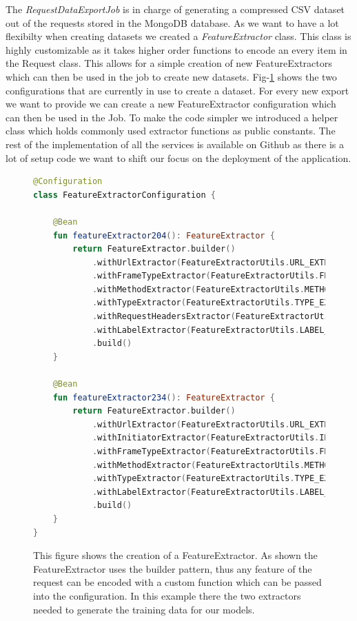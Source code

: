 The \emph{RequestDataExportJob} is in charge of generating a compressed CSV dataset out of the requests stored in the MongoDB database. As we want 
to have a lot flexibilty when creating datasets we created a \emph{FeatureExtractor} class. This class is highly customizable as it takes higher order functions
to encode an every item in the Request class. This allows for a simple creation of new FeatureExtractors which can then be used in the job to create new datasets.
Fig-\ref{fig:Feature} shows the two configurations that are currently in use to create a dataset. For every new export we want to provide we 
can create a new FeatureExtractor configuration which can then be used in the Job. To make the code simpler we introduced a helper class which 
holds commonly used extractor functions as public constants. The rest of the implementation of all the services is available on Github \cite{trackingDetectorInfra} as there is
a lot of setup code we want to shift our focus on the deployment of the application.
\begin{figure}[ht!]
\begin{lstlisting}[language=Kotlin]
@Configuration
class FeatureExtractorConfiguration {

    @Bean
    fun featureExtractor204(): FeatureExtractor {
        return FeatureExtractor.builder()
            .withUrlExtractor(FeatureExtractorUtils.URL_EXTRACTOR)
            .withFrameTypeExtractor(FeatureExtractorUtils.FRAME_TYPE_EXTRACTOR)
            .withMethodExtractor(FeatureExtractorUtils.METHOD_EXTRACTOR)
            .withTypeExtractor(FeatureExtractorUtils.TYPE_EXTRACTOR)
            .withRequestHeadersExtractor(FeatureExtractorUtils.REQUEST_HEADER_REFERER)
            .withLabelExtractor(FeatureExtractorUtils.LABEL_EXTRACTOR)
            .build()
    }

    @Bean
    fun featureExtractor234(): FeatureExtractor {
        return FeatureExtractor.builder()
            .withUrlExtractor(FeatureExtractorUtils.URL_EXTRACTOR)
            .withInitiatorExtractor(FeatureExtractorUtils.INITIATOR_EXTRACTOR)
            .withFrameTypeExtractor(FeatureExtractorUtils.FRAME_TYPE_EXTRACTOR)
            .withMethodExtractor(FeatureExtractorUtils.METHOD_EXTRACTOR)
            .withTypeExtractor(FeatureExtractorUtils.TYPE_EXTRACTOR)
            .withLabelExtractor(FeatureExtractorUtils.LABEL_EXTRACTOR)
            .build()
    }
}
\end{lstlisting}
\caption{This figure shows the creation of a FeatureExtractor. As shown the FeatureExtractor uses the builder pattern, thus any feature of 
the request can be encoded with a custom function which can be passed into the configuration. In this example there the two extractors needed
to generate the training data for our models.}
\label{fig:Feature}
\end{figure}

